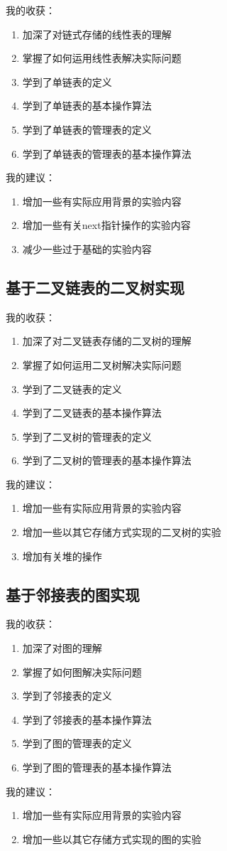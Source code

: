 \documentclass[supercite]{Experimental_Report}
\theoremstyle{definition}
\begin{document}
我的收获：
\begin{enumerate}
	\item 加深了对链式存储的线性表的理解
    \item 掌握了如何运用线性表解决实际问题
    \item 学到了单链表的定义
    \item 学到了单链表的基本操作算法
    \item 学到了单链表的管理表的定义
    \item 学到了单链表的管理表的基本操作算法
\end{enumerate}
我的建议：
\begin{enumerate}
	\item 增加一些有实际应用背景的实验内容
    \item 增加一些有关next指针操作的实验内容
    \item 减少一些过于基础的实验内容
\end{enumerate}

\subsection{基于二叉链表的二叉树实现}

我的收获：
\begin{enumerate}
	\item 加深了对二叉链表存储的二叉树的理解
    \item 掌握了如何运用二叉树解决实际问题
    \item 学到了二叉链表的定义
    \item 学到了二叉链表的基本操作算法
    \item 学到了二叉树的管理表的定义
    \item 学到了二叉树的管理表的基本操作算法
\end{enumerate}
我的建议：
\begin{enumerate}
	\item 增加一些有实际应用背景的实验内容
    \item 增加一些以其它存储方式实现的二叉树的实验
    \item 增加有关堆的操作
\end{enumerate}

\subsection{基于邻接表的图实现}

我的收获：
\begin{enumerate}
	\item 加深了对图的理解
    \item 掌握了如何图解决实际问题
    \item 学到了邻接表的定义
    \item 学到了邻接表的基本操作算法
    \item 学到了图的管理表的定义
    \item 学到了图的管理表的基本操作算法
\end{enumerate}
我的建议：
\begin{enumerate}
	\item 增加一些有实际应用背景的实验内容
    \item 增加一些以其它存储方式实现的图的实验
\end{enumerate}
\end{document}
